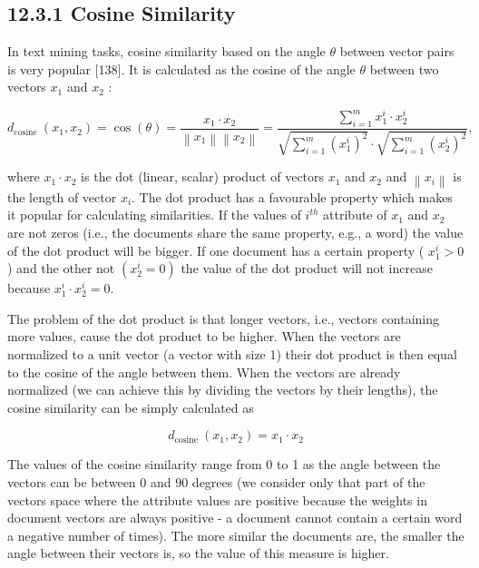 \documentclass[10pt]{book}
\begin{document}
\subsection*{12.3.1 Cosine Similarity}
In text mining tasks, cosine similarity based on the angle $\theta$ between vector pairs is very popular [138]. It is calculated as the cosine of the angle $\theta$ between two vectors $x_{1}$ and $x_{2}$ :


\begin{equation*}
d_{\text {cosine }}\left(x_{1}, x_{2}\right)=\cos (\theta)=\frac{x_{1} \cdot x_{2}}{\left\|x_{1}\right\|\left\|x_{2}\right\|}=\frac{\sum_{i=1}^{m} x_{1}^{i} \cdot x_{2}^{i}}{\sqrt{\sum_{i=1}^{m}\left(x_{1}^{i}\right)^{2}} \cdot \sqrt{\sum_{i=1}^{m}\left(x_{2}^{i}\right)^{2}}}, \tag{12.4}
\end{equation*}


where $x_{1} \cdot x_{2}$ is the dot (linear, scalar) product of vectors $x_{1}$ and $x_{2}$ and $\left\|x_{i}\right\|$ is the length of vector $x_{i}$. The dot product has a favourable property which makes it popular for calculating similarities. If the values of $i^{t h}$ attribute of $x_{1}$ and $x_{2}$ are not zeros (i.e., the documents share the same property, e.g., a word) the value of the dot product will be bigger. If one document has a certain property ( $x_{1}^{i}>0$ ) and the other not $\left(x_{2}^{i}=0\right)$ the value of the dot product will not increase because $x_{1}^{i} \cdot x_{2}^{i}=0$.

The problem of the dot product is that longer vectors, i.e., vectors containing more values, cause the dot product to be higher. When the vectors are normalized to a unit vector (a vector with size 1) their dot product is then equal to the cosine of the angle between them. When the vectors are already normalized (we can achieve this by dividing the vectors by their lengths), the cosine similarity can be simply calculated as


\begin{equation*}
d_{\text {cosine }}\left(x_{1}, x_{2}\right)=x_{1} \cdot x_{2} \tag{12.5}
\end{equation*}


The values of the cosine similarity range from 0 to 1 as the angle between the vectors can be between 0 and 90 degrees (we consider only that part of the vectors space where the attribute values are positive because the weights in document vectors are always positive - a document cannot contain a certain word a negative number of times). The more similar the documents are, the smaller the angle between their vectors is, so the value of this measure is higher.
\end{document}
